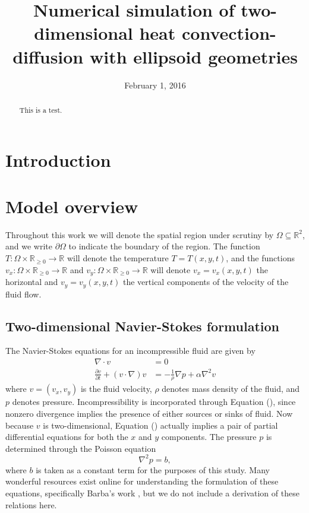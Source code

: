 \documentclass[12pt]{article}
\title{Numerical simulation of two-dimensional heat convection-diffusion with
ellipsoid geometries}
\date{February 1, 2016}
\newcommand{\R}{\mathbb{R}}
\begin{document}
\maketitle

\begin{abstract}
    This is a test.
\end{abstract}

\section{Introduction}

\section{Model overview}

Throughout this work we will denote the spatial region under scrutiny by
$\Omega \subseteq \R^2$, and we write $\partial \Omega$ to indicate the
boundary of the region. The function $T : \Omega \times \R_{\geq 0} \to \R$
will denote the temperature $T = T(x,y,t)$, and the functions $v_x : \Omega
\times \R_{\geq 0} \to \R$ and $v_y : \Omega \times \R_{\geq 0} \to \R$ will
denote $v_x = v_x(x,y,t)$ the horizontal and $v_y = v_y(x,y,t)$ the vertical
components of the velocity of the fluid flow. 

\subsection{Two-dimensional Navier-Stokes formulation}

The Navier-Stokes equations for an incompressible fluid are given by
\begin{align}
    \nabla \cdot v &= 0 \\
    \frac{\partial v}{\partial t} + (v \cdot \nabla) v &= -
    \frac{1}{\rho} \nabla p + \alpha \nabla^2 v
    \label{eq:\theequation}
\end{align}
where $v = (v_x, v_y)$ is the fluid velocity, $\rho$ denotes mass density of
the fluid, and $p$ denotes pressure. Incompressibility is incorporated
through Equation (), since nonzero divergence implies the presence of either
sources or sinks of fluid. Now because $v$ is two-dimensional, Equation
() actually implies a pair of partial differential equations for both the $x$
and $y$ components. The pressure $p$ is determined through the Poisson equation
\begin{equation}
    \nabla^2 p = b,
    \label{eq:\theequation}
\end{equation}
where $b$ is taken as a constant term for the purposes of this study. Many
wonderful resources exist online for understanding the formulation of these
equations, specifically Barba's work \cite{12-steps}, but we do not include a
derivation of these relations here.
\end{document}
